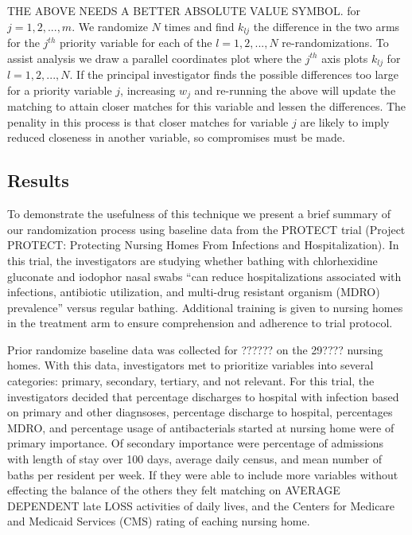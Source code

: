 \documentclass[]{sagej}
\begin{document}
THE ABOVE NEEDS A BETTER ABSOLUTE VALUE SYMBOL. for
\(j = 1, 2, ..., m.\) We randomize \(N\) times and find \(k_{lj}\) the
difference in the two arms for the \(j^{th}\) priority variable for each
of the \(l = 1, 2, ..., N\) re-randomizations. To assist analysis we
draw a parallel coordinates plot where the \(j^{th}\) axis plots
\(k_{lj}\) for \(l = 1, 2, ..., N.\) If the principal investigator finds
the possible differences too large for a priority variable \(j\),
increasing \(w_j\) and re-running the above will update the matching to
attain closer matches for this variable and lessen the differences. The
penality in this process is that closer matches for variable \(j\) are
likely to imply reduced closeness in another variable, so compromises
must be made.

\subsection{Results}\label{results}

To demonstrate the usefulness of this technique we present a brief
summary of our randomization process using baseline data from the
PROTECT trial (Project PROTECT: Protecting Nursing Homes From Infections
and Hospitalization). In this trial, the investigators are studying
whether bathing with chlorhexidine gluconate and iodophor nasal swabs
``can reduce hospitalizations associated with infections, antibiotic
utilization, and multi-drug resistant organism (MDRO) prevalence''
versus regular bathing. Additional training is given to nursing homes in
the treatment arm to ensure comprehension and adherence to trial
protocol.

Prior randomize baseline data was collected for ?????? on the 29????
nursing homes. With this data, investigators met to prioritize variables
into several categories: primary, secondary, tertiary, and not relevant.
For this trial, the investigators decided that percentage discharges to
hospital with infection based on primary and other diagnsoses,
percentage discharge to hospital, percentages MDRO, and percentage usage
of antibacterials started at nursing home were of primary importance. Of
secondary importance were percentage of admissions with length of stay
over 100 days, average daily census, and mean number of baths per
resident per week. If they were able to include more variables without
effecting the balance of the others they felt matching on AVERAGE
DEPENDENT late LOSS activities of daily lives, and the Centers for
Medicare and Medicaid Services (CMS) rating of eaching nursing home.
\end{document}
